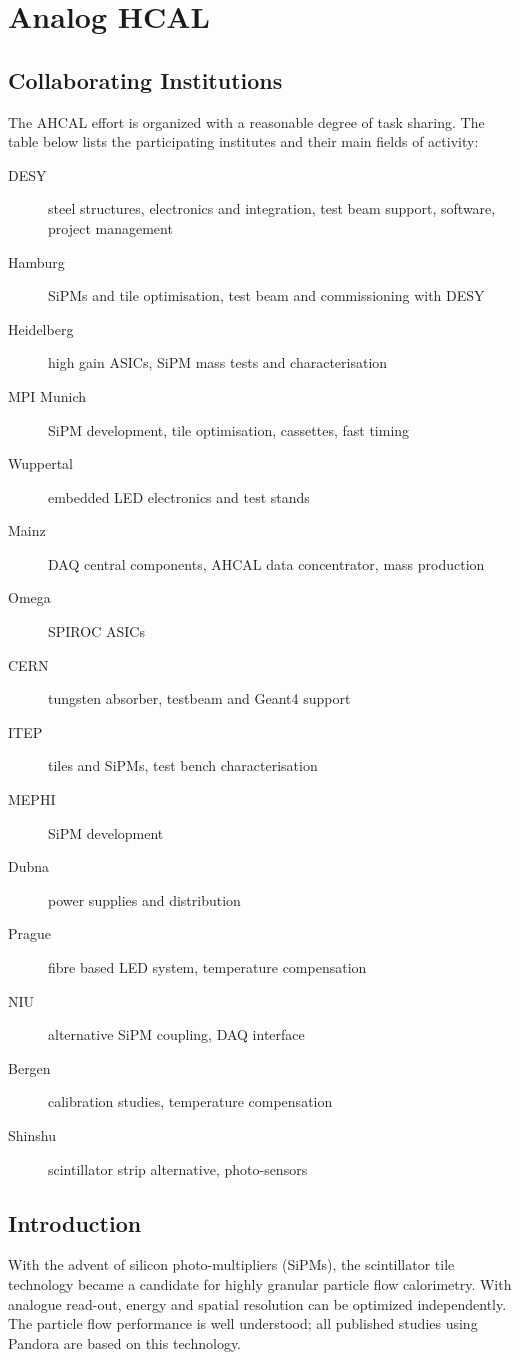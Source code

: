 \section{Analog HCAL}
\subsection{Collaborating Institutions}
The AHCAL effort is organized with a reasonable degree of task sharing. The table below lists the participating institutes and their main fields of activity:
\begin{description}
\item[DESY] steel structures, electronics and integration, test beam support, software, project management
\item[Hamburg] SiPMs and tile optimisation, test beam and commissioning with DESY 
\item[Heidelberg] high gain ASICs, SiPM mass tests and characterisation  
\item[MPI Munich] SiPM development, tile optimisation, cassettes, fast timing
\item[Wuppertal] embedded LED electronics and test stands
\item[Mainz] DAQ central components, AHCAL data concentrator, mass production
\item[Omega] SPIROC ASICs 
\item[CERN] tungsten absorber, testbeam and Geant4 support 
\item[ITEP] tiles and SiPMs, test bench characterisation
\item[MEPHI] SiPM development
\item[Dubna] power supplies and distribution
\item[Prague] fibre based LED system, temperature compensation
\item[NIU] alternative SiPM coupling, DAQ interface
\item[Bergen] calibration studies, temperature compensation
\item[Shinshu] scintillator strip alternative, photo-sensors
\end{description}
\subsection{Introduction}
With the advent of silicon photo-multipliers (SiPMs), the scintillator tile technology became a candidate for highly granular particle flow calorimetry. With analogue read-out, energy and spatial resolution can be optimized independently. The particle flow performance is well understood; all published studies using Pandora are based on this technology. 

